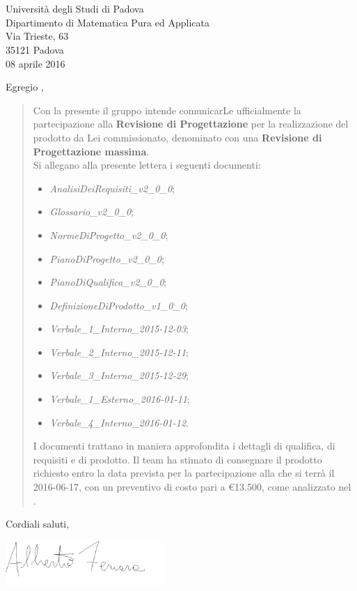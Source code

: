 \begin{letter}{\hfill \TV \\
	\hfill \RC \\
	\hfill Università degli Studi di Padova \\
	\hfill Dipartimento di Matematica Pura ed Applicata \\
	\hfill Via Trieste, 63 \\
	\hfill 35121 Padova \\
	\hfill 08 aprile 2016}

\date{}
\opening{Egregio \TV,}

	\begin{quotation}
		Con la presente il gruppo \textit{\gruppo} intende comunicarLe ufficialmente la partecipazione alla \textbf{Revisione di Progettazione} per la realizzazione del prodotto da Lei commissionato, denominato \textbf{\progetto} con una \textbf{Revisione di Progettazione massima}.
		\\
		Si allegano alla presente lettera i seguenti documenti:
		\begin{itemize}
			\item \textit{AnalisiDeiRequisiti\_v2\_0\_0};
			\item \textit{Glossario\_v2\_0\_0};
			\item \textit{NormeDiProgetto\_v2\_0\_0};
			\item \textit{PianoDiProgetto\_v2\_0\_0};
			\item \textit{PianoDiQualifica\_v2\_0\_0};
			\item \textit{DefinizioneDiProdotto\_v1\_0\_0};
			\item \textit{Verbale\_1\_Interno\_2015-12-03};
			\item \textit{Verbale\_2\_Interno\_2015-12-11};
			\item \textit{Verbale\_3\_Interno\_2015-12-29};
			\item \textit{Verbale\_1\_Esterno\_2016-01-11};
			\item \textit{Verbale\_4\_Interno\_2016-01-12}.
		\end{itemize}
		I documenti trattano in maniera approfondita i dettagli di qualifica, di requisiti e di prodotto.
		Il team ha stimato di consegnare il prodotto richiesto entro la data prevista per la partecipazione alla \RA{} che si terrà il 2016-06-17, con un preventivo di costo pari a \euro13.500, come analizzato nel \textit{\PdP}.	
	\end{quotation}
	\closing{Cordiali saluti,}
	\includegraphics[keepaspectratio = true, width=6cm]{Firma/AF.png}


\end{letter}


